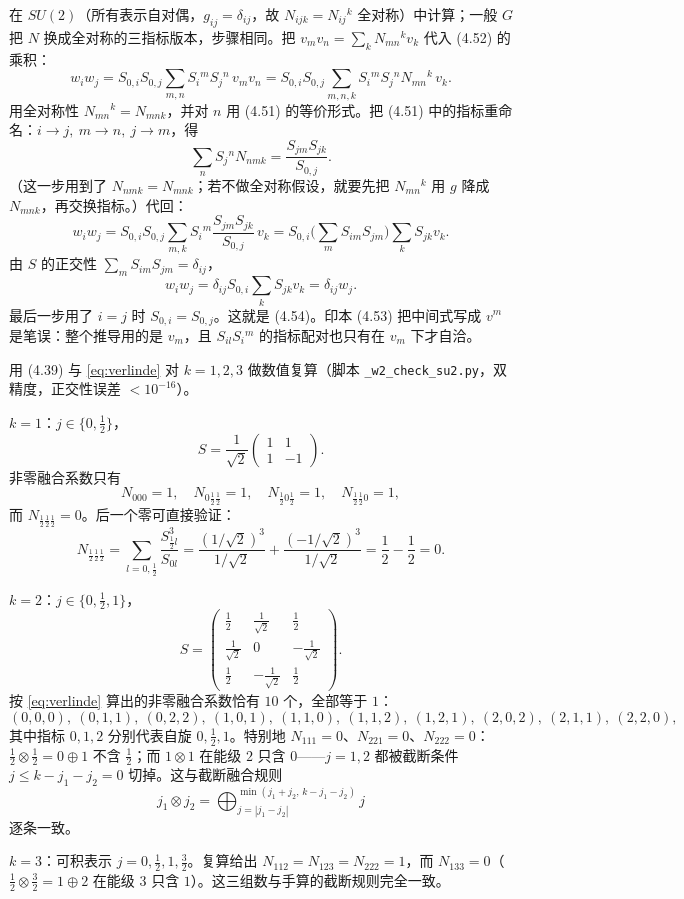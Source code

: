 \begin{derivation}
在 $SU(2)$（所有表示自对偶，$g_{ij}=\delta_{ij}$，故 $N_{ijk}=N_{ij}{}^k$ 全对称）中计算；一般 $G$ 把 $N$ 换成全对称的三指标版本，步骤相同。把 $v_mv_n=\sum_k N_{mn}{}^k v_k$ 代入 (4.52) 的乘积：
\[
w_iw_j=S_{0,i}S_{0,j}\sum_{m,n}S_i{}^m S_j{}^n\,v_mv_n
=S_{0,i}S_{0,j}\sum_{m,n,k}S_i{}^m S_j{}^n N_{mn}{}^k\,v_k .
\]
用全对称性 $N_{mn}{}^k=N_{mnk}$，并对 $n$ 用 (4.51) 的等价形式。把 (4.51) 中的指标重命名：$i\to j,\ m\to n,\ j\to m$，得
\[
\sum_n S_j{}^n N_{nmk}=\frac{S_{jm}S_{jk}}{S_{0,j}} .
\]
（这一步用到了 $N_{nmk}=N_{mnk}$；若不做全对称假设，就要先把 $N_{mn}{}^k$ 用 $g$ 降成 $N_{mnk}$，再交换指标。）代回：
\[
w_iw_j=S_{0,i}S_{0,j}\sum_{m,k}S_i{}^m\frac{S_{jm}S_{jk}}{S_{0,j}}\,v_k
=S_{0,i}\Big(\sum_m S_{im}S_{jm}\Big)\sum_k S_{jk}v_k .
\]
由 $S$ 的正交性 $\sum_m S_{im}S_{jm}=\delta_{ij}$，
\[
w_iw_j=\delta_{ij}S_{0,i}\sum_k S_{jk}v_k=\delta_{ij}w_j .
\]
最后一步用了 $i=j$ 时 $S_{0,i}=S_{0,j}$。这就是 (4.54)。印本 (4.53) 把中间式写成 $v^m$ 是笔误：整个推导用的是 $v_m$，且 $S_{il}S_i{}^m$ 的指标配对也只有在 $v_m$ 下才自洽。\ours
\end{derivation}

\begin{derivation}[D-9.5：$SU(2)$ 的显式复算]
用 (4.39) 与 \eqref{eq:verlinde} 对 $k=1,2,3$ 做数值复算（脚本 \texttt{\_w2\_check\_su2.py}，双精度，正交性误差 $<10^{-16}$）。

\textbf{$k=1$}：$j\in\{0,\frac12\}$，
\[
S=\frac{1}{\sqrt2}\begin{pmatrix}1&1\\1&-1\end{pmatrix}.
\]
非零融合系数只有
\[
N_{000}=1,\quad N_{0\frac12\frac12}=1,\quad N_{\frac12 0\frac12}=1,\quad N_{\frac12\frac12 0}=1,
\]
而 $N_{\frac12\frac12\frac12}=0$。后一个零可直接验证：
\[
N_{\frac12\frac12\frac12}
=\sum_{l=0,\frac12}\frac{S_{\frac12 l}^3}{S_{0l}}
=\frac{(1/\sqrt2)^3}{1/\sqrt2}+\frac{(-1/\sqrt2)^3}{1/\sqrt2}
=\frac12-\frac12=0 .
\]

\textbf{$k=2$}：$j\in\{0,\frac12,1\}$，
\[
S=\begin{pmatrix}
\frac12 & \frac{1}{\sqrt2} & \frac12\\[2pt]
\frac{1}{\sqrt2} & 0 & -\frac{1}{\sqrt2}\\[2pt]
\frac12 & -\frac{1}{\sqrt2} & \frac12
\end{pmatrix}.
\]
按 \eqref{eq:verlinde} 算出的非零融合系数恰有 $10$ 个，全部等于 $1$：
\[
(0,0,0),\ (0,1,1),\ (0,2,2),\ (1,0,1),\ (1,1,0),\ (1,1,2),\ (1,2,1),\ (2,0,2),\ (2,1,1),\ (2,2,0),
\]
其中指标 $0,1,2$ 分别代表自旋 $0,\frac12,1$。特别地 $N_{111}=0$、$N_{221}=0$、$N_{222}=0$：$\frac12\otimes\frac12=0\oplus1$ 不含 $\frac12$；而 $1\otimes1$ 在能级 $2$ 只含 $0$——$j=1,2$ 都被截断条件 $j\le k-j_1-j_2=0$ 切掉。这与截断融合规则
\[
j_1\otimes j_2=\bigoplus_{j=|j_1-j_2|}^{\min(j_1+j_2,\,k-j_1-j_2)}j
\]
逐条一致。

\textbf{$k=3$}：可积表示 $j=0,\frac12,1,\frac32$。复算给出 $N_{112}=N_{123}=N_{222}=1$，而 $N_{133}=0$（$\frac12\otimes\frac32=1\oplus2$ 在能级 $3$ 只含 $1$）。这三组数与手算的截断规则完全一致。\ours
\end{derivation}

